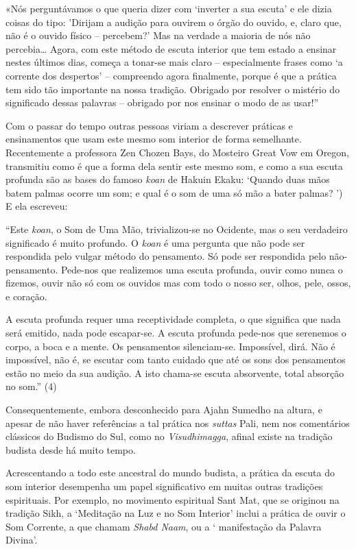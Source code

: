 «Nós perguntávamos o que queria dizer com `inverter a sua escuta' e ele
dizia coisas do tipo: 'Dirijam a audição para ouvirem o órgão do ouvido,
e, claro que, não é o ouvido físico -- percebem?' Mas na verdade a
maioria de nós não percebia\ldots{} Agora, com este método de escuta
interior que tem estado a ensinar nestes últimos dias, começa a tonar-se
mais claro -- especialmente frases como `a corrente dos despertos' --
compreendo agora finalmente, porque é que a prática tem sido tão
importante na nossa tradição. Obrigado por resolver o mistério do
significado dessas palavras -- obrigado por nos ensinar o modo de as
usar!''

Com o passar do tempo outras pessoas viriam a descrever práticas e
ensinamentos que usam este mesmo som interior de forma semelhante.
Recentemente a professora Zen Chozen Bays, do Mosteiro Great Vow em
Oregon, transmitiu como é que a forma dela sentir este mesmo som, e como
a sua escuta profunda são as bases do famoso \emph{koan} de Hakuin
Ekaku: `Quando duas mãos batem palmas ocorre um som; e qual é o som de
uma só mão a bater palmas? ') E ela escreveu:

``Este \emph{koan}, o Som de Uma Mão, trivializou-se no Ocidente, mas o
seu verdadeiro significado é muito profundo. O \emph{koan} é uma
pergunta que não pode ser respondida pelo vulgar método do pensamento.
Só pode ser respondida pelo não-pensamento. Pede-nos que realizemos uma
escuta profunda, ouvir como nunca o fizemos, ouvir não só com os ouvidos
mas com todo o nosso ser, olhos, pele, ossos, e coração.

A escuta profunda requer uma receptividade completa, o que significa que
nada será emitido, nada pode escapar-se. A escuta profunda pede-nos que
serenemos o corpo, a boca e a mente. Os pensamentos silenciam-se.
Impossível, dirá. Não é impossível, não é, se escutar com tanto cuidado
que até os sons dos pensamentos estão no meio da sua audição. A isto
chama-se escuta absorvente, total absorção no som.'' (4)

Consequentemente, embora desconhecido para Ajahn Sumedho na altura, e
apesar de não haver referências a tal prática nos \emph{suttas} Pali,
nem nos comentários clássicos do Budismo do Sul, como no
\emph{Visudhimagga}, afinal existe na tradição budista desde há muito
tempo.

Acrescentando a todo este ancestral do mundo budista, a prática da
escuta do som interior desempenha um papel significativo em muitas
outras tradições espirituais. Por exemplo, no movimento espiritual Sant
Mat, que se originou na tradição Sikh, a `Meditação na Luz e no Som
Interior' inclui a prática de ouvir o Som Corrente, a que chamam
\emph{Shabd Naam}, ou a ` manifestação da Palavra Divina'.

